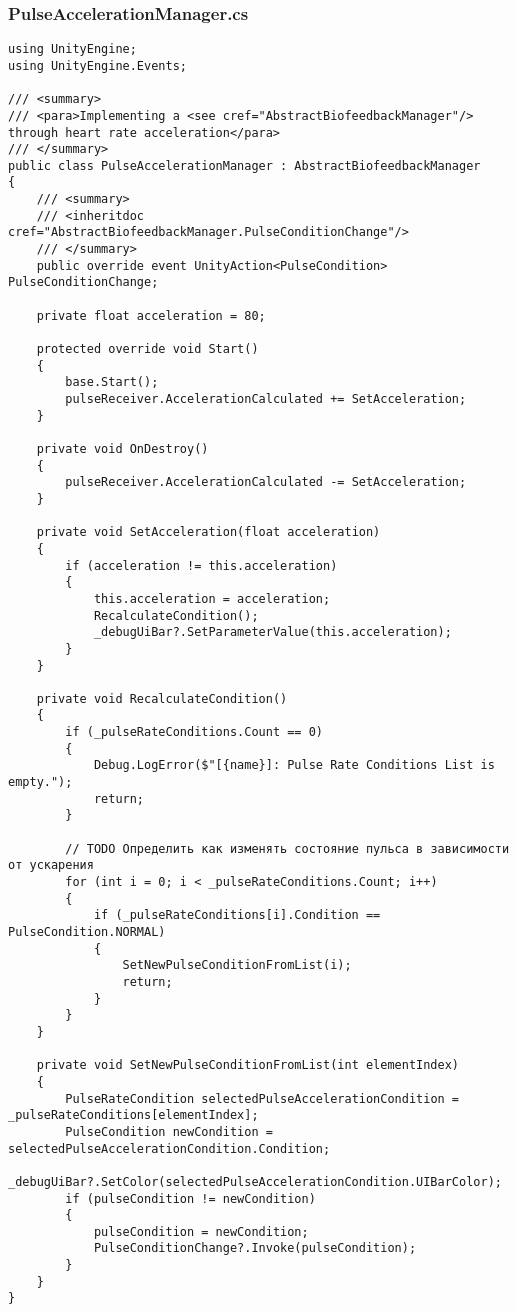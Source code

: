\subsubsection*{PulseAccelerationManager.cs}
\begin{verbatim}
using UnityEngine;
using UnityEngine.Events;

/// <summary>
/// <para>Implementing a <see cref="AbstractBiofeedbackManager"/> through heart rate acceleration</para>
/// </summary>
public class PulseAccelerationManager : AbstractBiofeedbackManager
{
    /// <summary>
    /// <inheritdoc cref="AbstractBiofeedbackManager.PulseConditionChange"/>
    /// </summary>
    public override event UnityAction<PulseCondition> PulseConditionChange;
    
    private float acceleration = 80;

    protected override void Start()
    {
        base.Start();
        pulseReceiver.AccelerationCalculated += SetAcceleration;
    }

    private void OnDestroy()
    {
        pulseReceiver.AccelerationCalculated -= SetAcceleration;
    }

    private void SetAcceleration(float acceleration)
    {
        if (acceleration != this.acceleration)
        {
            this.acceleration = acceleration;
            RecalculateCondition();
            _debugUiBar?.SetParameterValue(this.acceleration);
        }
    }

    private void RecalculateCondition()
    {
        if (_pulseRateConditions.Count == 0)
        {
            Debug.LogError($"[{name}]: Pulse Rate Conditions List is empty.");
            return;
        }

        // TODO Определить как изменять состояние пульса в зависимости от ускарения
        for (int i = 0; i < _pulseRateConditions.Count; i++)
        {
            if (_pulseRateConditions[i].Condition == PulseCondition.NORMAL)
            {
                SetNewPulseConditionFromList(i);
                return;
            }
        }
    }

    private void SetNewPulseConditionFromList(int elementIndex)
    {
        PulseRateCondition selectedPulseAccelerationCondition = _pulseRateConditions[elementIndex];
        PulseCondition newCondition = selectedPulseAccelerationCondition.Condition;
        _debugUiBar?.SetColor(selectedPulseAccelerationCondition.UIBarColor);
        if (pulseCondition != newCondition)
        {
            pulseCondition = newCondition;
            PulseConditionChange?.Invoke(pulseCondition);
        }
    }
}
\end{verbatim}
